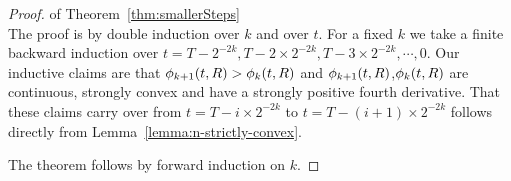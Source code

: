\documentclass[12pt]{article} %
\begin{document}
\begin{proof}  of Theorem~\ref{thm:smallerSteps} \\
The proof is by double induction over $k$ and over $t$.
For a fixed $k$ we take a finite backward induction over
$t=T-2^{-2k},T-2 \times 2^{-2k},T-3 \times 2^{-2k},\cdots,0$.
Our inductive claims are that $\phi_{k+1}(t,R) > \phi_{k}(t,R)$ and
$\phi_{k+1}(t,R)$,$\phi_{k}(t,R)$ are continuous, strongly convex and
have a strongly positive fourth derivative. That these claims carry over
from $t=T-i \times 2^{-2k}$ to  $t=T-(i+1) \times 2^{-2k}$ follows
directly from Lemma~\ref{lemma:n-strictly-convex}.

The theorem follows by forward induction on $k$.

\end{proof}
\end{document}
